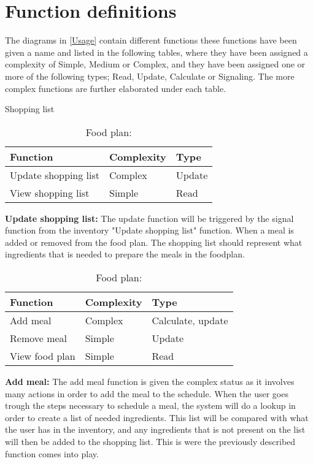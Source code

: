 \section{Function definitions}
	The diagrams in \cref{Usage} contain different functions these functions have been given a name and listed in the following tables, where they have been assigned a complexity of Simple, Medium or Complex, and they have been assigned one or more of the following types; Read, Update, Calculate or Signaling. The more complex functions are further elaborated under each table.
\begin{table}[H]
	\centering
	\caption{Shopping list}
	\begin{tabular}{|l|l|l|}\hline
		\textbf{Function}&\textbf{Complexity}&\textbf{Type}\\\hline
	  Update shopping list  &  Complex & Update \\\hline
	  View shopping list    &  Simple  & Read   \\\hline
  \end{tabular}
  \begin{flushleft}
    \textbf{Update shopping list:} The update function will be triggered by the signal function from the inventory "Update shopping list" function. When a meal is added or removed from the food plan. The shopping list should represent what ingredients that is needed to prepare the meals in the foodplan.
  \end{flushleft}
	\caption{Food plan:}
  \begin{tabular}{|l|l|l|}\hline
		\textbf{Function}&\textbf{Complexity}&\textbf{Type}\\\hline
	  Add meal              &  Complex & Calculate, update \\\hline
	  Remove meal           &  Simple  & Update            \\\hline
	  View food plan        &  Simple  & Read              \\\hline
  \end{tabular}
  \begin{flushleft}
    \textbf{Add meal:} The add meal function is given the complex status as it involves many actions in order to add the meal to the schedule. When the user goes trough the steps necessary to schedule a meal, the system will do a lookup in order to create a list of needed ingredients. This list will be compared with what the user has in the inventory, and any ingredients that is not present on the list will then be added to the shopping list. This is were the previously described function comes into play.

\end{flushleft}
\end{table}
